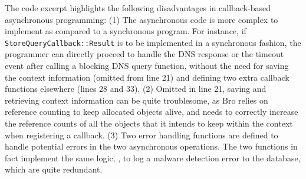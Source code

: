 The code excerpt highlights the following disadvantages in callback-based asynchronous programming:
(1) The asynchronous code is more complex to implement as compared to a synchronous program. For instance, if \lstinline[style=InlineStyle]{StoreQueryCallback::Result} is to be implemented in a synchronous fashion, the programmer can directly proceed to handle the DNS response or the timeout event after calling a blocking DNS query function, without the need for saving the context information (omitted from line 21) and defining two extra callback functions elsewhere (lines 28 and 33). %
(2) Omitted in line 21, saving and retrieving context information can be quite troublesome, as Bro relies on reference counting to keep allocated objects alive, and needs to correctly increase the reference counts of all the objects that it intends to keep within the context when registering a callback.
(3) Two error handling functions are defined to handle potential errors in the two asynchronous operations. The two functions in fact implement the same logic, \ie, to log a malware detection error to the database, which are quite redundant.





